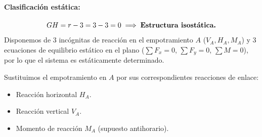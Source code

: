 \paragraph{Clasificación estática:}
\begin{equation}
    GH = r - 3 = 3 - 3 = 0 \implies \text{\textbf{Estructura isostática.}}
\end{equation}
Disponemos de 3 incógnitas de reacción en el empotramiento $A$ ($V_A, H_A, M_A$) y 3 ecuaciones de equilibrio estático en el plano ($\sum F_x = 0$, $\sum F_y = 0$, $\sum M = 0$), por lo que el sistema es estáticamente determinado.


Sustituimos el empotramiento en $A$ por sus correspondientes reacciones de enlace:
\begin{itemize}
    \item Reacción horizontal $H_A$.
    \item Reacción vertical $V_A$.
    \item Momento de reacción $M_A$ (supuesto antihorario).
\end{itemize}

